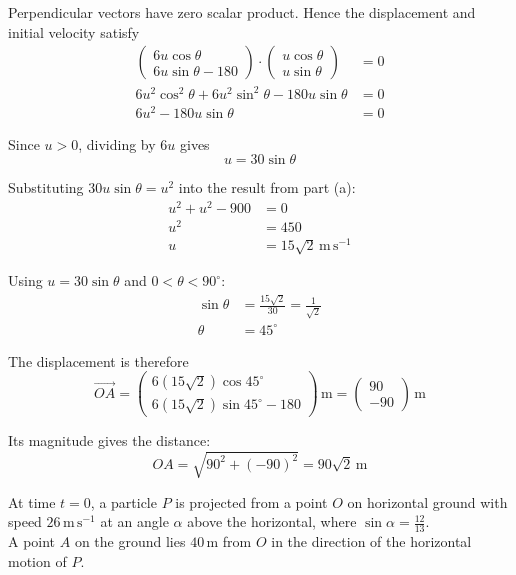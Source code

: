 \documentclass[leqno]{article}
\begin{document}
\begin{enumerate}[
  label=\textbf{\arabic*.},
  leftmargin=*,
  topsep=0pt,
  partopsep=0pt,
  parsep=0pt
]
\begin{djsSolution}
\begin{enumerate}[label=\textbf{(\alph*)}, start=1]
Perpendicular vectors have zero scalar product. Hence the displacement and initial velocity satisfy
\begin{align*}
\begin{pmatrix}6u\cos\theta\\6u\sin\theta-180\end{pmatrix}
\cdot\begin{pmatrix}u\cos\theta\\u\sin\theta\end{pmatrix}&=0\\
6u^2\cos^2\theta+6u^2\sin^2\theta-180u\sin\theta&=0\\
6u^2-180u\sin\theta&=0
\end{align*}

Since \(u>0\), dividing by \(6u\) gives
\[
u=30\sin\theta
\]

Substituting \(30u\sin\theta=u^2\) into the result from part (a):
\begin{align*}
u^2+u^2-900&=0\\
u^2&=450\\
u&=15\sqrt{2}\,\mathrm{m\,s^{-1}}
\end{align*}

Using \(u=30\sin\theta\) and \(0<\theta<90^\circ\):
\begin{align*}
\sin\theta&=\frac{15\sqrt{2}}{30}=\frac{1}{\sqrt{2}}\\
\theta&=45^\circ
\end{align*}

The displacement is therefore
\[
\overrightarrow{OA}
=\begin{pmatrix}6(15\sqrt{2})\cos45^\circ\\6(15\sqrt{2})\sin45^\circ-180\end{pmatrix}\,\mathrm{m}
=\begin{pmatrix}90\\-90\end{pmatrix}\,\mathrm{m}
\]

Its magnitude gives the distance:
\[
OA=\sqrt{90^2+(-90)^2}=90\sqrt{2}\,\mathrm{m}
\]

\end{enumerate}
\end{djsSolution}

\newpage

\questionitem

At time $t=0$, a particle $P$ is projected from a point $O$ on horizontal ground with speed $26\,\mathrm{m\,s^{-1}}$ at an angle $\alpha$ above the horizontal, where $\sin\alpha=\frac{12}{13}$. \\
A point $A$ on the ground lies $40\,\mathrm{m}$ from $O$ in the direction of the horizontal motion of $P$. \\


\end{enumerate}
\end{document}

